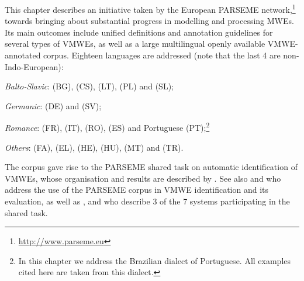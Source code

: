 \documentclass[output=paper,modfonts]{langscibook}
\begin{document}
This chapter describes an initiative taken by the European PARSEME net\-work,\footnote{{\scriptsize  \url{http://www.parseme.eu}}} towards bringing about substantial progress in modelling and processing MWEs. Its main outcomes include unified definitions and annotation guidelines for several types of VMWEs, as well as a large multilingual openly available VMWE-annotated corpus. Eighteen languages are addressed (note that the last 4 are non-Indo-European): 
\begin{sitem}
\item\label{language-groups}
\textit{Balto-Slavic}:  (BG),  (CS),  (LT),  (PL) and  (SL);
\item
\textit{Germanic}:  (DE) and  (SV); 
\item
\textit{Romance}:  (FR),  (IT),  (RO),  (ES) and Portuguese (PT);\footnote{In this chapter we address the Brazilian dialect of Portuguese. All examples cited here are taken from this dialect.}
\item
\textit{Others}:  (FA),  (EL),  (HE),  (HU),  (MT) and  (TR).
 \end{sitem}
The corpus gave rise to the PARSEME shared task on automatic identification of VMWEs, whose organisation and results are described by \citet{MWEWorkshop}. See also  and  who address the use of the PARSEME corpus in VMWE identification and its evaluation, as well as ,  and  who  describe 3 of the 7 systems participating in the shared task.
 
\end{document}
